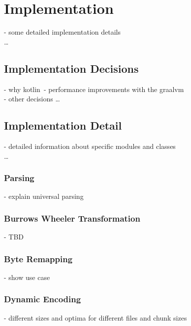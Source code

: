 
\chapter{Implementation}
\label{ch:Implementation}
- some detailed implementation details\\
\ldots

\section{Implementation Decisions}
\label{ch:Implementation:sec:Implementation Decisions}
- why kotlin\
- performance improvements with the graalvm\\
- other decisions
\ldots

\section{Implementation Detail}
\label{ch:Implementation:sec:Implementation Detail}
- detailed information about specific modules and classes\\
\ldots


\subsection{Parsing}
- explain universal parsing\\
\subsection{Burrows Wheeler Transformation}
- TBD\\
\subsection{Byte Remapping}
- show use case \\
\subsection{Dynamic Encoding}
- different sizes and optima for different files and chunk sizes \\

